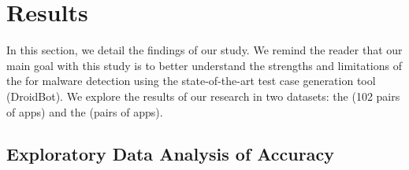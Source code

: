\section{Results}\label{sec:results}



In this section, we detail the findings of our study.  We remind the reader that our main goal with this study is to
better understand the strengths and limitations of the \mas for malware detection using the state-of-the-art
test case generation tool (DroidBot). We explore
the results of our research in two datasets: the \sds (102 pairs of apps) and the
\cds (\apps pairs of apps).



\subsection{Exploratory Data Analysis of Accuracy}


